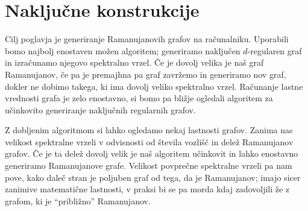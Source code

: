 \section{Naključne konstrukcije}
Cilj poglavja je generiranje Ramanujanovih grafov na računalniku. Uporabili bomo najbolj enostaven možen algoritem; generiramo naključen \(d\)-regularen graf in izračunamo njegovo spektralno vrzel. Če je dovolj velika je naš graf Ramanujanov, če pa je premajhna pa graf zavržemo in generiramo nov graf, dokler ne dobimo takega, ki ima dovolj veliko spektralno vrzel. Računanje lastne vrednosti grafa je zelo enostavno, si bomo pa bližje ogledali algoritem za učinkovito generiranje naključnih regularnih grafov.

Z dobljenim algoritmom si lahko ogledamo nekaj lastnosti grafov. Zanima nas velikost spektralne vrzeli v odvisnosti od števila vozlišč in delež Ramanujanov grafov. Če je ta delež dovolj velik je naš algoritem učinkovit in lahko enostavno generiramo Ramanujanove grafe. Velikost povprečne spektralne vrzeli pa nam pove, kako daleč stran je poljuben graf od tega, da je Ramanujanov; imajo sicer zanimive matematične lastnosti, v praksi bi se pa morda kdaj zadovoljili že z grafom, ki je ``približno'' Ramanujanov. 

